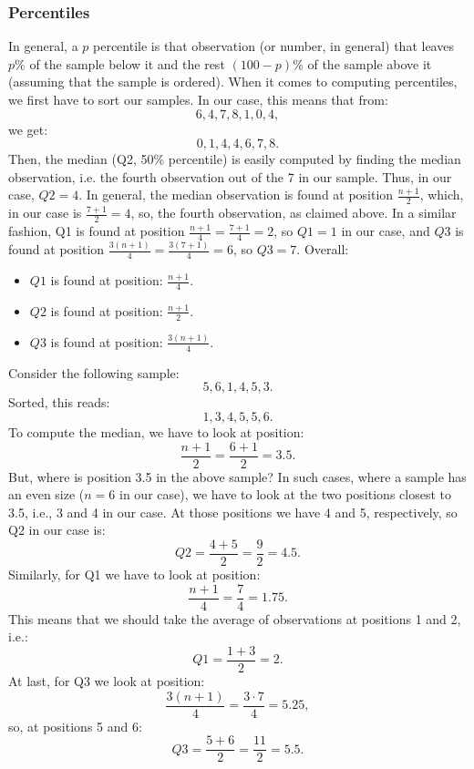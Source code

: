 \documentclass[a4paper, 11pt]{article}
\theoremstyle{definition}
\begin{document}
	\subsubsection*{Percentiles}
	In general, a $p$ percentile is that observation (or number, in general) that leaves $p\%$ of the sample below it and the rest $(100-p)\%$ of the sample above it (assuming that the sample is ordered). When it comes to computing percentiles, we first have to sort our samples. In our case, this means that from:
	\[6,4,7,8,1,0,4,\]
	we get:
	\[0,1,4,4,6,7,8.\]
	Then, the median (Q2, 50\% percentile) is easily computed by finding the median observation, i.e. the fourth observation out of the 7 in our sample. Thus, in our case, $Q2=4$. In general, the median observation is found at position $\frac{n+1}{2}$, which, in our case is $\frac{7+1}{2}=4$, so, the fourth observation, as claimed above. In a similar fashion, Q1 is found at position $\frac{n+1}{4}=\frac{7+1}{4}=2$, so $Q1=1$ in our case, and $Q3$ is found at position $\frac{3(n+1)}{4}=\frac{3(7+1)}{4}=6$, so $Q3=7$. Overall:
	\begin{itemize}
		\item $Q1$ is found at position: $\frac{n+1}{4}$.
		\item $Q2$ is found at position: $\frac{n+1}{2}$.
		\item $Q3$ is found at position: $\frac{3(n+1)}{4}$.
	\end{itemize}
	
	Consider the following sample:
	\[5,6,1,4,5,3.\]
	Sorted, this reads:
	\[1,3,4,5,5,6.\]
	To compute the median, we have to look at position:
	\[\frac{n+1}{2}=\frac{6+1}{2}=3.5.\]
	But, where is position 3.5 in the above sample? In such cases, where a sample has an even size ($n=6$ in our case), we have to look at the two positions closest to 3.5, i.e., 3 and 4 in our case. At those positions we have 4 and 5, respectively, so Q2 in our case is:
	\[Q2=\frac{4+5}{2}=\frac{9}{2}=4.5.\]
	Similarly, for Q1 we have to look at position:
	\[\frac{n+1}{4}=\frac{7}{4}=1.75.\]
	This means that we should take the average of observations at positions 1 and 2, i.e.:
	\[Q1=\frac{1+3}{2}=2.\]
	At last, for Q3 we look at position:
	\[\frac{3(n+1)}{4}=\frac{3\cdot7}{4}=5.25,\]
	so, at positions 5 and 6:
	\[Q3=\frac{5+6}{2}=\frac{11}{2}=5.5.\]
\end{document}
